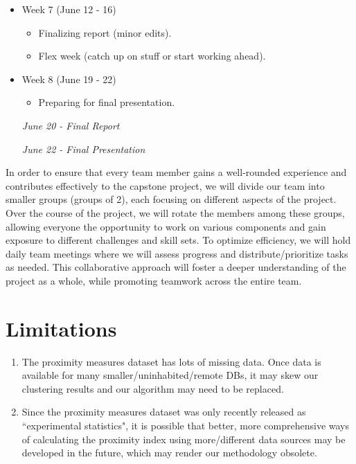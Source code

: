 \documentclass[11pt, a4paper]{article}
\begin{document}
\begin{itemize}
\item Week 7  \dotfill (June 12 - 16)
\begin{itemize}
\item Finalizing report (minor edits).
\item Flex week (catch up on stuff or start working ahead).
\end{itemize}

\item Week 8  \dotfill (June 19 - 22)
\begin{itemize}
\item Preparing for final presentation.
\end{itemize}

\textit{June 20 - Final Report}
\par
\textit{June 22 - Final Presentation}

\end{itemize}

\vspace{0.5pc}

In order to ensure that every team member gains a well-rounded experience and contributes effectively to the capstone project, we will divide our team into smaller groups (groups of 2), each focusing on different aspects of the project. Over the course of the project, we will rotate the members among these groups, allowing everyone the opportunity to work on various components and gain exposure to different challenges and skill sets. To optimize efficiency, we will hold daily team meetings where we will assess progress and distribute/prioritize tasks as needed. This collaborative approach will foster a deeper understanding of the project as a whole, while promoting teamwork across the entire team.




\section*{Limitations}

\begin{enumerate}
\item The proximity measures dataset has lots of missing data. Once data is available for many smaller/uninhabited/remote DBs, it may skew our clustering results and our algorithm may need to be replaced.
\item Since the proximity measures dataset was only recently released as ``experimental statistics", it is possible that better, more comprehensive ways of calculating the proximity index using more/different data sources may be developed in the future, which may render our methodology obsolete.
\end{enumerate}
\end{document}
